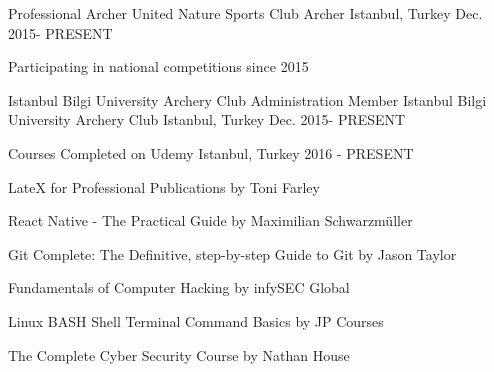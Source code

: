 \begin{cventries}
\cventry
{Professional Archer} %
{United Nature Sports Club Archer} %
{Istanbul, Turkey} %
{Dec. 2015- PRESENT} %
{ %
\begin{cvitems}
\item {Participating in national competitions since 2015}
\end{cvitems}
}


\cventry
{Istanbul Bilgi University Archery Club Administration Member} %
{Istanbul Bilgi University Archery Club} %
{Istanbul, Turkey} %
{Dec. 2015- PRESENT} %
{}%




\cventry
{} %
{Courses Completed on Udemy} %
{Istanbul, Turkey} %
{2016 - PRESENT} %
{ %
\begin{cvitems}
\item {LateX for Professional Publications by Toni Farley}
\item {React Native - The Practical Guide by Maximilian Schwarzmüller}
\item {Git Complete: The Definitive, step-by-step Guide to Git by Jason Taylor}
\item {Fundamentals of Computer Hacking by infySEC Global}
\item {Linux BASH Shell Terminal Command Basics by JP Courses}
\item {The Complete Cyber Security Course by Nathan House}
\end{cvitems}
}


\end{cventries}